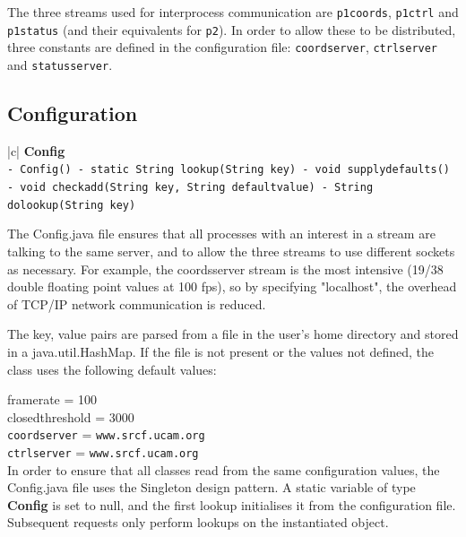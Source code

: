 \documentclass[12pt,a4,notitlepage]{report}
\renewcommand{\_}{\texttt{\symbol{95}}}
\newcommand{\<}{\texttt{\symbol{60}}}
\renewcommand{\>}{\texttt{\symbol{62}}}
\newcommand{\class}[1]{\textbf{#1}}
\newcommand{\scopendpoint}[1]{\texttt{#1}}
\newcommand{\variable}[1]{\texttt{#1}}
\begin{document}
{The three streams used for interprocess communication are \scopendpoint{p1coords}, \scopendpoint{p1ctrl} and \scopendpoint{p1status} (and their equivalents for \scopendpoint{p2}). In order to allow these to be distributed, three constants are defined in the configuration file: \variable{coordserver}, \variable{ctrlserver} and \variable{statusserver}. 

\subsection{Configuration}

\begin{tabular}{|c|} \hline 
\class{Config} \\ \hline
{}
{\variable{- Config() \newline
- static String lookup(String key) \newline
- void supply\_defaults() \newline
- void check\_add(String key, String defaultvalue) \newline
- String do\_lookup(String key)
} } \\ \hline
\end{tabular}

The Config.java file ensures that all processes with an interest in a stream are talking to the same server, and to allow the three streams to use different sockets as necessary. For example, the coordsserver stream is the most intensive (19/38 double floating point values at 100 fps), so by specifying "localhost", the overhead of TCP/IP network communication is reduced.

The \<key, value\> pairs are parsed from a file in the user's home directory and stored in a java.util.HashMap. If the file is not present or the values not defined, the class uses the following default values:

framerate = 100 \\
closedthreshold = 3000 \\
\variable{coordserver} = \verb^www.srcf.ucam.org^ \\
\variable{ctrlserver} = \verb^www.srcf.ucam.org^ \\

In order to ensure that all classes read from the same configuration values, the Config.java file uses the Singleton design pattern. A static variable of type \class{Config} is set to null, and the first lookup initialises it from the configuration file. Subsequent requests only perform lookups on the instantiated object.

}
\end{document}
